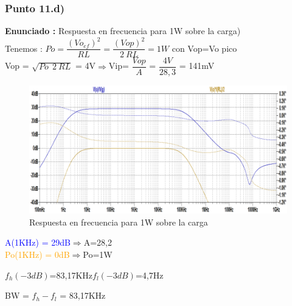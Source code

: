 \documentclass[12pt]{book}
\begin{document}
\subsubsection{Punto 11.d)}
\textbf{Enunciado : } Respuesta en frecuencia para 1W sobre la carga)\\[1cm]
Tenemos : $Po=\dfrac{(Vo_{ef})^2}{RL}=\dfrac{(Vop)^2}{2\:RL}=1W$ \quad con Vop=Vo pico\\
Vop = $\sqrt{Po\:\:2\:RL}$ = 4V\quad $\Longrightarrow$\qquad Vip= $\dfrac{Vop}{A}$ = $\dfrac{4V}{28,3}$ = 141mV
\begin{figure}[H]
\centering
\includegraphics[scale=0.4]{figuras/11-d-Pcarga1W.png}
\caption{Respuesta en frecuencia para 1W sobre la carga}
\label{figura11d}
\end{figure}
\begin{center}
\textcolor{blue}{A(1KHz) = 29dB}\qquad $\Longrightarrow$\qquad A=28,2\\
\textcolor{orange}{Po(1KHz) = 0dB}\qquad $\Longrightarrow$\qquad Po=1W
\end{center}
$f_{h}(-3dB)$=83,17KHz\qquad $f_{l}(-3dB)$=4,7Hz
\begin{center}
BW = $f_{h}-f_{l}$ = 83,17KHz
\end{center}
\end{document}

